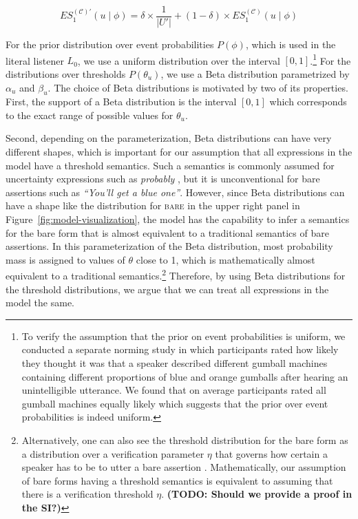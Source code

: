 \documentclass[lucida,biblatex]{sp} %
\newcommand{\todo}[1]{}
\renewcommand{\todo}[1]{{\bf \color{red} (TODO: {#1})}}
\begin{document}
$$ES_1^{(\mathscr{C})'}(u \mid \phi) = \delta \times \frac{1}{|U'|} +  (1 - \delta) \times ES_1^{(\mathscr{C})}(u \mid \phi)$$

For the prior distribution over event probabilities $P(\phi)$, which is used in the literal listener $L_0$, 
we use a uniform distribution over the interval $[0,1]$.\footnote{To 
verify the assumption that the prior on event probabilities is uniform, we conducted a separate norming study in which participants rated 
how likely they thought it was that a speaker described different gumball machines containing different 
proportions of blue and orange gumballs after hearing an unintelligible utterance. We found that on average 
participants rated all gumball machines equally likely which suggests that the prior over event probabilities is 
indeed uniform.} For the distributions over thresholds $P(\theta_u)$, we use a Beta distribution parametrized by 
$\alpha_u$ and $\beta_u$. The choice of Beta distributions is motivated by two of its properties. First, the support of a Beta distribution 
is the interval $[0,1]$ which corresponds to the exact range of possible values for $\theta_u$.

Second, depending on the parameterization, Beta distributions can have very different shapes, which is important for 
our assumption that all expressions in the model have a threshold semantics. 
Such a semantics is commonly assumed for uncertainty expressions such as \textit{probably} \citep[e.g.,][]{Yalcin2010,Lassiter2016}, 
but it is unconventional for bare assertions such as \textit{``You'll get a blue one''}. However, since Beta distributions can have a shape 
like the distribution for \textsc{bare} in the upper right panel in Figure~\ref{fig:model-visualization}, the model has the capability to infer
a semantics for the bare form that is almost equivalent to a traditional semantics of bare assertions. In this parameterization of the
Beta distribution, most probability mass is assigned to values of $\theta$ close to 1, which is mathematically almost equivalent to
a traditional semantics.\footnote{Alternatively, one can also see the threshold distribution for the bare form as a distribution over a verification parameter $\eta$ that governs 
how certain a speaker has to be to utter a bare assertion \cite{TODO ask Dan}. Mathematically, our assumption of bare forms having a threshold
semantics is equivalent to assuming that there is a verification threshold $\eta$. \todo{Should we provide a proof in the SI?}}
Therefore, by using Beta distributions for the threshold distributions, we argue that we can treat all expressions in the model the same.
\end{document}
